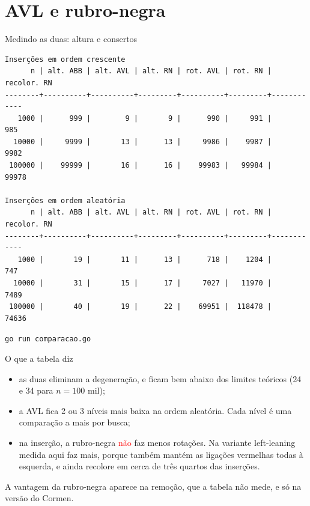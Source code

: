 \documentclass{beamer}
\newcommand{\tcr}[1]{\textcolor{red}{#1}}
\begin{document}
\section{AVL e rubro-negra}

\begin{frame}[fragile]{Medindo as duas: altura e consertos}
	\begin{verbatim}
Inserções em ordem crescente
      n | alt. ABB | alt. AVL | alt. RN | rot. AVL | rot. RN | recolor. RN
--------+----------+----------+---------+----------+---------+------------
   1000 |      999 |        9 |       9 |      990 |     991 |         985
  10000 |     9999 |       13 |      13 |     9986 |    9987 |        9982
 100000 |    99999 |       16 |      16 |    99983 |   99984 |       99978

Inserções em ordem aleatória
      n | alt. ABB | alt. AVL | alt. RN | rot. AVL | rot. RN | recolor. RN
--------+----------+----------+---------+----------+---------+------------
   1000 |       19 |       11 |      13 |      718 |    1204 |         747
  10000 |       31 |       15 |      17 |     7027 |   11970 |        7489
 100000 |       40 |       19 |      22 |    69951 |  118478 |       74636
\end{verbatim}

	\vspace{0.1cm}
	\footnotesize \texttt{go run comparacao.go}
\end{frame}

\begin{frame}{O que a tabela diz}
	\begin{itemize}
		\item as duas eliminam a degeneração, e ficam bem abaixo dos limites
		      teóricos (24 e 34 para $n = 100$ mil);
		\item a AVL fica 2 ou 3 níveis mais baixa na ordem aleatória. Cada nível é
		      uma comparação a mais por busca;
		\item na inserção, a rubro-negra \tcr{não} faz menos rotações. Na variante
		      left-leaning medida aqui faz mais, porque também mantém as ligações
		      vermelhas todas à esquerda, e ainda recolore em cerca de três quartos
		      das inserções.
	\end{itemize}

	\vspace{0.4cm}
	A vantagem da rubro-negra aparece na remoção, que a tabela não mede, e só na
	versão do Cormen.
\end{frame}
\end{document}
